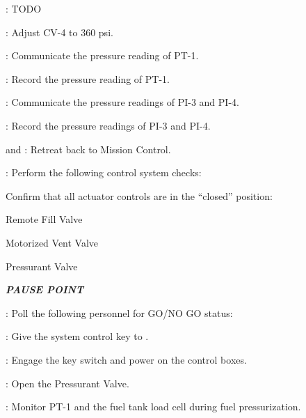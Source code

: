 \begin{checklist}
\begin{checklist}[label=$\bullet$]
\begin{checklist}
            \item \primary{}: TODO
        \end{checklist}
    \end{checklist}
    \item \primary{}: Adjust CV-4 to 360 psi.
    \item \daq{}: Communicate the pressure reading of PT-1.
    \item \ops{}: Record the pressure reading of PT-1.
    \item \primary{}: Communicate the pressure readings of PI-3 and PI-4.
    \item \ops{}: Record the pressure readings of PI-3 and PI-4.
    \item \primary{} and \secondary{}: Retreat back to Mission Control.
    \item \control{}: Perform the following control system checks:
    \begin{checklist}
        \item Confirm that all actuator controls are in the ``closed'' position:
        \begin{checklist}
            \item Remote Fill Valve
            \item Motorized Vent Valve
            \item Pressurant Valve
        \end{checklist}
    \end{checklist}
    \item \textbf{\textit{PAUSE POINT}}
    \item \ops{}: Poll the following personnel for GO/NO GO status:
    \begin{checklist}
		\item \control{}
        \item \daq{}
        \item \primary{}
        \item \secondary{}
		\item \peri{}
		\item \perii{}
		\item \periii{}
    \end{checklist}
    \item \ops{}: Give the system control key to \control{}.
    \item \control{}: Engage the key switch and power on the control boxes.
    \item \control{}: Open the Pressurant Valve.
    \item \daq{}: Monitor PT-1 and the fuel tank load cell during fuel pressurization.

\end{checklist}
